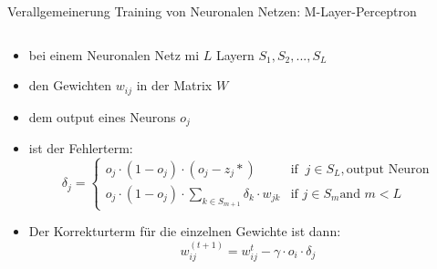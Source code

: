 \documentclass[aspectratio=1610, xcolor=dvipsnames, 9pt]{beamer}
\begin{document}
      \begin{frame}{ Verallgemeinerung Training von Neuronalen Netzen: M-Layer-Perceptron}
        \begin{columns}
          \begin{column}{1\textwidth}
            \begin{itemize}
              \item bei einem Neuronalen Netz mi $L$ Layern $S_1, S_2 , ... , S_L$
              \item den Gewichten $w_{ij}$ in der Matrix $W$
              \item dem output eines Neurons $o_j$
              \item ist der Fehlerterm: 
            \begin{equation*}
              \delta_j = \begin{cases} o_j \cdot (1-o_j) \cdot  (o_j -z_j*) & \text{if }\ j \in S_L, \text{output Neuron} \\ o_j \cdot (1-o_j) \cdot \sum_{k \in S_{m+1}} \delta_k \cdot w_{jk} & \text{if } j \in S_m \text{and } m<L \end{cases}
            \end{equation*}
            \item Der Korrekturterm für die einzelnen Gewichte ist dann:
            \begin{equation}
              w_{ij}^{(t+1)} = w_{ij}^{t} - \gamma \cdot o_i \cdot \delta_j 
            \end{equation}
            \end{itemize}
          \end{column}
        \end{columns}
      \end{frame}
\end{document}
